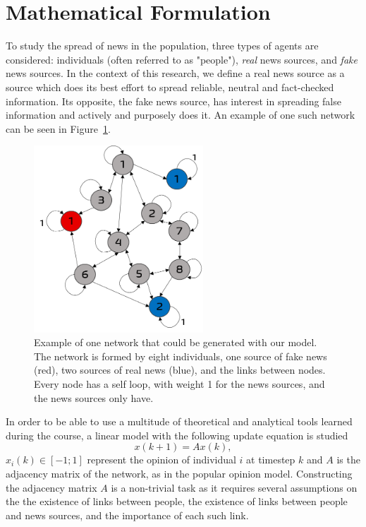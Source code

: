 \section{Mathematical Formulation}
\label{sec:mathematical}
To study the spread of news in the population, three types of agents are considered: individuals (often referred to as "people"), \textit{real} news sources, and \textit{fake} news sources. In the context of this research, we define a real news source as a source which does its best effort to spread reliable, neutral and fact-checked information. Its opposite, the fake news source, has interest in spreading false information and actively and purposely does it. An example of one such network can be seen in Figure~\ref{pics:network_example}.

\begin{figure}
\centering
\includegraphics[width=2.5in]{Figures/network_example.png}
\caption{Example of one network that could be generated with our model. The network is formed by eight individuals, one source of fake news (red), two sources of real news (blue), and the links between nodes. Every node has a self loop, with weight 1 for the news sources, and the news sources only have. }
\label{pics:network_example}
\end{figure}
In order to be able to use a multitude of theoretical and analytical tools learned during the course, a linear model with the following update equation is studied
\begin{equation}
x(k+1) = A x(k),
\end{equation}
$x_i(k) \in [-1;1]$ represent the opinion of individual $i$ at timestep $k$ and $A$ is the adjacency matrix of the network, as in the popular opinion model\cite{Friedkin1990}.
Constructing the adjacency matrix $A$ is a non-trivial task as it requires several assumptions on the the existence of links between people, the existence of links between people and news sources, and the importance of each such link.
